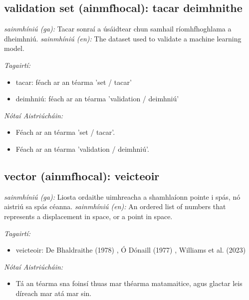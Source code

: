 \documentclass{article}
\begin{document}
\subsection*{validation set (ainmfhocal): tacar deimhnithe} 
 \noindent \textit{sainmhíniú (ga):} Tacar sonraí a úsáidtear chun samhail ríomhfhoghlama a dheimhniú.
\newline\newline
 \noindent \textit{sainmhíniú (en):} The dataset used to validate a machine learning model.
\newline

 \noindent \textit{Tagairtí:}
\begin{itemize}
	\item tacar: féach ar an téarma 'set / tacar'
	\item deimhniú: féach ar an téarma 'validation / deimhniú'
\end{itemize}

 \noindent \textit{Nótaí Aistriúcháin:}
\begin{itemize}
	\item Féach ar an téarma 'set / tacar'.
	\item Féach ar an téarma 'validation / deimhniú'.
\end{itemize}


\subsection*{vector (ainmfhocal): veicteoir} 
 \noindent \textit{sainmhíniú (ga):} Liosta ordaithe uimhreacha a shamhlaíonn pointe i spás, nó aistriú sa spás céanna.
\newline\newline
 \noindent \textit{sainmhíniú (en):} An ordered list of numbers that represents a displacement in space, or a point in space.
\newline

 \noindent \textit{Tagairtí:}
\begin{itemize}
	\item veicteoir: De Bhaldraithe (1978) \cite{de-bhaldraithe}, Ó Dónaill (1977) \cite{odonaill}, Williams et al. (2023) \cite{storchiste}
\end{itemize}

 \noindent \textit{Nótaí Aistriúcháin:}
\begin{itemize}
	\item Tá an téarma sna foinsí thuas mar théarma matamaitice, agus glactar leis díreach mar atá mar sin.
\end{itemize}
\end{document}
